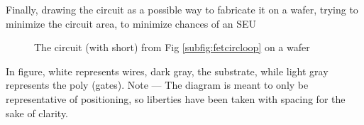 \newpage
Finally, drawing the circuit as a possible way to fabricate it 
on a wafer, trying to minimize the circuit area, to minimize chances
of an SEU

\begin{figure}[ht]
    \centering
    \def\svgwidth{0.5\textwidth}
    \caption{The circuit (with short) from 
            Fig \ref{subfig:fetcircloop} on a wafer}
\label{fig:wafer}
\end{figure}

In figure, white represents wires, dark gray, the substrate, while
light gray represents the poly (gates). Note --- The diagram is meant to only be 
representative of positioning, so liberties have been taken with spacing
for the sake of clarity. 

